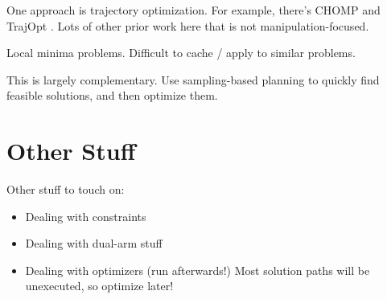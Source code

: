 One approach is trajectory optimization.
For example, there's CHOMP \cite{zucker2013chomp}
and TrajOpt \cite{schulman2013trajopt}.
Lots of other prior work here that is not manipulation-focused.

Local minima problems.
Difficult to cache / apply to similar problems.

This is largely complementary.
Use sampling-based planning to quickly find feasible solutions,
and then optimize them.

\section{Other Stuff}

Other stuff to touch on:
\begin{itemize}
\item Dealing with constraints
\item Dealing with dual-arm stuff
\item Dealing with optimizers (run afterwards!)
   Most solution paths will be unexecuted, so optimize later!
\end{itemize}
